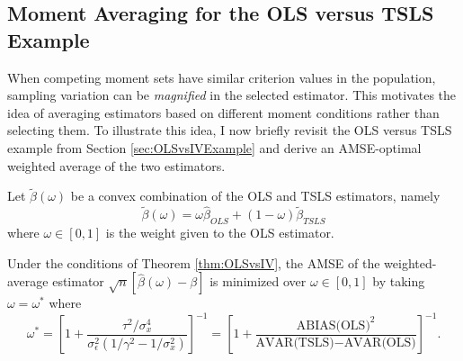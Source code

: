 \subsection{Moment Averaging for the OLS versus TSLS Example}
\label{sec:momentavgexample}
When competing moment sets have similar criterion values in the population, sampling variation can be \emph{magnified} in the selected estimator.
This motivates the idea of averaging estimators based on different moment conditions rather than selecting them.
To illustrate this idea, I now briefly revisit the OLS versus TSLS example from Section \ref{sec:OLSvsIVExample} and derive an AMSE-optimal weighted average of the two estimators.

Let $\widetilde{\beta}(\omega)$ be a convex combination of the OLS and TSLS estimators, namely  
\begin{equation}
	\widetilde{\beta}(\omega) = \omega \widehat{\beta}_{OLS} + (1 - \omega) \widetilde{\beta}_{TSLS}
\end{equation}
where $\omega \in [0,1]$ is the weight given to the OLS estimator.
\begin{thm}
	\label{thm:OLSvsIVavg} 
	Under the conditions of Theorem \ref{thm:OLSvsIV}, the AMSE of the weighted-average estimator $\sqrt{n}\left[\widehat{\beta}(\omega) - \beta \right]$ is minimized over $\omega \in [0,1]$ by taking $\omega = \omega^*$ where
	$$ \omega^* = \left[1 + \frac{\tau^2/\sigma_x^4}{\sigma_\epsilon^2(1/\gamma^2 - 1/\sigma_x^2)}\right]^{-1} = \left[1 + \frac{\mbox{ABIAS(OLS)}^2}{\mbox{AVAR(TSLS)}-\mbox{AVAR(OLS)}} \right]^{-1}.$$
\end{thm}

